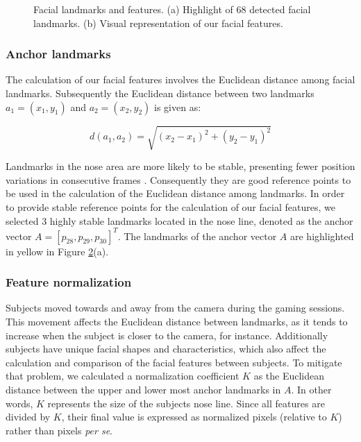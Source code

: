 \begin{figure}
\begin{subfigure}[b]{0.5\textwidth}
    \caption{}
    \label{fig:head-tilt}
  \end{subfigure}
  \caption{Facial landmarks and features. (a) Highlight of 68 detected facial landmarks. (b) Visual representation of our facial features.}
  \label{fig:faces}
\end{figure}


\subsubsection{Anchor landmarks}

The calculation of our facial features involves the Euclidean distance among facial landmarks. Subsequently the Euclidean distance between two landmarks $a_1 = (x_1, y_1)$ and $a_2 = (x_2, y_2)$ is given as:

\[
d(a_1,a_2) = \sqrt{(x_2 - x_1)^2 + (y_2 - y_1)^2}
\]

Landmarks in the nose area are more likely to be stable, presenting fewer position variations in consecutive frames \cite{giannakakis2017stress}. Consequently they are good reference points to be used in the calculation of the Euclidean distance among landmarks. In order to provide stable reference points for the calculation of our facial features, we selected 3 highly stable landmarks located in the nose line, denoted as the anchor vector $A = [p_{28}, p_{29}, p_{30}]^T$. The landmarks of the anchor vector $A$ are highlighted in yellow in Figure \ref{fig:faces}(a).

\subsubsection{Feature normalization}

Subjects moved towards and away from the camera during the gaming sessions. This movement affects the Euclidean distance between landmarks, as it tends to increase when the subject is closer to the camera, for instance. Additionally subjects have unique facial shapes and characteristics, which also affect the calculation and comparison of the facial features between subjects. To mitigate that problem, we calculated a normalization coefficient $K$ as the Euclidean distance between the upper and lower most anchor landmarks in $A$. In other words, $K$ represents the size of the subjects nose line. Since all features are divided by $K$, their final value is expressed as normalized pixels (relative to $K$) rather than pixels \textit{per se}.

